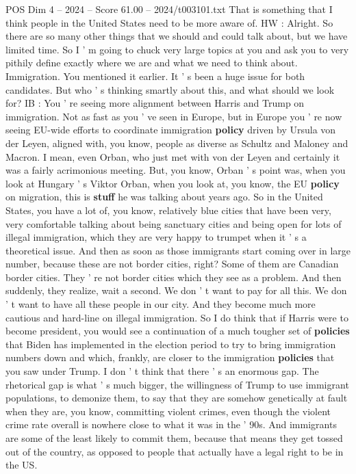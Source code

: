 \begin{textsample}{POS Dim 4 – 2024 – Score 61.00 – 2024/t003101.txt}
That is something that I think people in the United States need to be more aware of.
HW : Alright.
So there are so many other things that we should and could talk about, but we have limited time.
So I ' m going to chuck very large topics at you and ask you to very pithily define exactly where we are and what we need to think about.
Immigration.
You mentioned it earlier.
It ' s been a huge issue for both candidates.
But who ' s thinking smartly about this, and what should we look for?
IB : You ' re seeing more alignment between Harris and Trump on immigration.
Not as fast as you ' ve seen in Europe, but in Europe you ' re now seeing EU-wide efforts to coordinate immigration \textbf{policy} driven by Ursula von der Leyen, aligned with, you know, people as diverse as Schultz and Maloney and Macron.
I mean, even Orban, who just met with von der Leyen and certainly it was a fairly acrimonious meeting.
But, you know, Orban ' s point was, when you look at Hungary ' s Viktor Orban, when you look at, you know, the EU \textbf{policy} on migration, this is \textbf{stuff} he was talking about years ago.
So in the United States, you have a lot of, you know, relatively blue cities that have been very, very comfortable talking about being sanctuary cities and being open for lots of illegal immigration, which they are very happy to trumpet when it ' s a theoretical issue.
And then as soon as those immigrants start coming over in large number, because these are not border cities, right?
Some of them are Canadian border cities.
They ' re not border cities which they see as a problem.
And then suddenly, they realize, wait a second.
We don ' t want to pay for all this.
We don ' t want to have all these people in our city.
And they become much more cautious and hard-line on illegal immigration.
So I do think that if Harris were to become president, you would see a continuation of a much tougher set of \textbf{policies} that Biden has implemented in the election period to try to bring immigration numbers down and which, frankly, are closer to the immigration \textbf{policies} that you saw under Trump.
I don ' t think that there ' s an enormous gap.
The rhetorical gap is what ' s much bigger, the willingness of Trump to use immigrant populations, to demonize them, to say that they are somehow genetically at fault when they are, you know, committing violent crimes, even though the violent crime rate overall is nowhere close to what it was in the ' 90s.
And immigrants are some of the least likely to commit them, because that means they get tossed out of the country, as opposed to people that actually have a legal right to be in the US.

\end{textsample}
